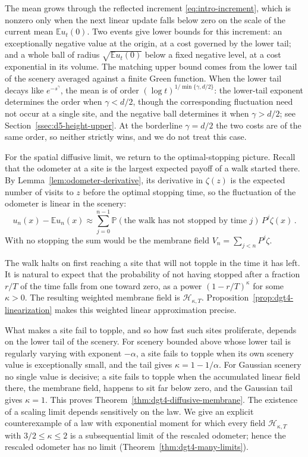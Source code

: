 \documentclass[11pt]{amsart}
\theoremstyle{plain}
\theoremstyle{definition}
\newcommand{\E}{\mathbb{E}}
\renewcommand{\P}{\mathbb{P}}
\begin{document}
The mean grows through the reflected increment \eqref{eq:intro-increment},
which is nonzero only when the next linear update falls below zero on the scale
of the current mean $\E u_t(0)$. Two events give lower bounds for this increment: an exceptionally negative value at the origin, at a cost governed by the lower tail; and a whole ball of radius $\sqrt{\E u_t(0)}$ below a fixed
negative level, at a cost exponential in its volume. The matching upper bound comes from the lower tail of the scenery averaged against a finite Green function. When the lower tail
decays like $e^{-s^\gamma}$, the mean is of order $(\log t)^{1/\min\{\gamma,d/2\}}$: the lower-tail exponent determines the order when $\gamma<d/2$, though the corresponding fluctuation need not occur at a single site,
and the negative ball determines it when $\gamma>d/2$; see Section~\ref{ssec:d5-height-upper}. At the
borderline $\gamma=d/2$ the two costs are of the same order, so neither strictly
wins, and we do not treat this case.

For the spatial diffusive limit, we return to the optimal-stopping picture. Recall
that the odometer at a site is the largest expected payoff of a walk started there. By Lemma~\ref{lem:odometer-derivative}, its derivative in $\zeta(z)$ is the expected number of visits to $z$ before the optimal stopping time, so the fluctuation of the odometer is linear in the scenery:
\[
	u_n(x)-\E u_n(x)
	\approx
	\sum_{j=0}^{n-1}
	\P(\text{the walk has not stopped by time }j)\,P^j\zeta(x)\, .
\]
With no stopping the sum would be the
membrane field $V_n=\sum_{j<n}P^j\zeta$.

The walk halts on first reaching a site that will not topple in the time it
has left. It is natural to expect that the probability of not having stopped after a fraction $r/T$ of the time falls from one toward zero, as a power $(1-r/T)^\kappa$ for some $\kappa > 0$. The resulting weighted membrane field is $\mathcal H_{\kappa,T}$. Proposition~\ref{prop:dgt4-linearization} makes this weighted linear approximation precise.

What makes a site fail to topple, and so how fast such sites proliferate, depends on the lower tail of the scenery. For scenery bounded above whose lower tail is regularly varying with exponent $-\alpha$, a site fails to topple
when its own scenery value is exceptionally small, and the tail gives $\kappa=1-1/\alpha$.
For Gaussian scenery no single value is decisive; a site fails to topple when the
accumulated linear field there, the membrane field, happens to sit far below
zero, and the Gaussian tail gives $\kappa=1$. This proves
Theorem~\ref{thm:dgt4-diffusive-membrane}. The existence of a scaling limit depends sensitively on the law. We give an explicit counterexample
of a law with exponential moment for which every field $\mathcal H_{\kappa,T}$ with
$3/2\leq\kappa\leq2$ is a subsequential limit of the rescaled odometer;
hence the rescaled odometer has no limit
(Theorem~\ref{thm:dgt4-many-limits}).
\end{document}
